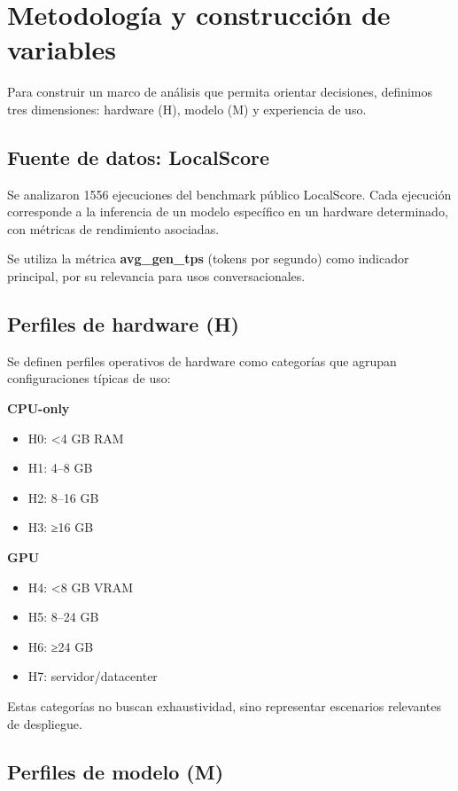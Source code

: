\documentclass{llncs}
\begin{document}
\section{Metodología y construcción de variables}\label{metodologia}

Para construir un marco de análisis que permita orientar decisiones, definimos tres dimensiones: hardware (H), modelo (M) y experiencia de uso.

\subsection{Fuente de datos: LocalScore}\label{datos}

Se analizaron 1556 ejecuciones del benchmark público LocalScore. Cada ejecución corresponde a la inferencia de un modelo específico en un hardware determinado, con métricas de rendimiento asociadas.

Se utiliza la métrica \textbf{avg\_gen\_tps} (tokens por segundo) como indicador principal, por su relevancia para usos conversacionales.

\subsection{Perfiles de hardware (H)}\label{hardware}

Se definen perfiles operativos de hardware como categorías que agrupan configuraciones típicas de uso:

\textbf{CPU-only}
\begin{itemize}
    \item H0: \textless4 GB RAM
    \item H1: 4–8 GB
    \item H2: 8–16 GB
    \item H3: ≥16 GB
\end{itemize}

\textbf{GPU}
\begin{itemize}
    \item H4: \textless8 GB VRAM
    \item H5: 8–24 GB
    \item H6: ≥24 GB
    \item H7: servidor/datacenter
\end{itemize}

Estas categorías no buscan exhaustividad, sino representar escenarios relevantes de despliegue.

\subsection{Perfiles de modelo (M)}\label{modelos}
\end{document}
